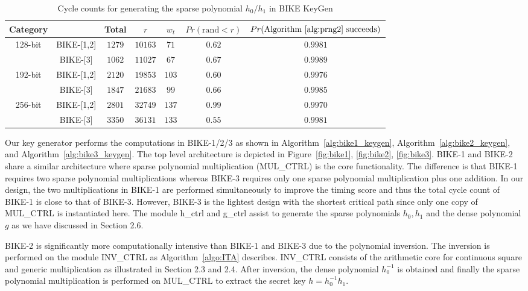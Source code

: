 \documentclass[runningheads]{llncs}
\begin{document}
\begin{table}[!tb]\centering
\caption{Cycle counts for generating the sparse polynomial $h_0/h_1$ in BIKE KeyGen}
\begin{tabular}{cc|ccccc}
  \hline
 \textbf{Category}        &             & Total & $r$  & $w_t$  & $Pr(\text{rand} < r)$& $Pr(\text{Algorithm~\ref{alg:prng2} succeeds})$\\\hline
\multirow{ 2}{*}{128-bit} &  BIKE-[1,2] & $1279$ & $10163$  & $71$  & $0.62$ & $0.9981$\\
                          &  BIKE-[3] & $1062$ & $11027$  & $67$  & $0.67$& $0.9989$\\
  \hline
\multirow{ 2}{*}{192-bit} &  BIKE-[1,2] & $2120$ & $19853$  & $103$  &$0.60$& $0.9976$\\
                          &  BIKE-[3] & $1847$ & $21683$  & $99$  &$0.66$& $0.9985$\\
  \hline
\multirow{ 2}{*}{256-bit} &  BIKE-[1,2] & $2801$ & $32749$  & $137$  &$0.99$& $0.9970$\\
                          &  BIKE-[3] & $3350$ & $36131$  & $133$  &$0.55$& $0.9981$\\
  \hline
\end{tabular}
\end{table}

Our key generator performs the computations in BIKE-1/2/3 as shown in Algorithm~\ref{alg:bike1_keygen}, Algorithm~\ref{alg:bike2_keygen}, and Algorithm~\ref{alg:bike3_keygen}. The top level architecture is depicted in Figure~\ref{fig:bike1}, \ref{fig:bike2}, \ref{fig:bike3}. BIKE-1 and BIKE-2 share a similar architecture where sparse polynomial multiplication (MUL\_CTRL) is the core functionality. The difference is that BIKE-1 requires two sparse polynomial multiplications whereas BIKE-3 requires only one sparse polynomial multiplication plus one addition. In our design, the two multiplications in BIKE-1 are performed simultaneously to improve the timing score and thus the total cycle count of BIKE-1 is close to that of BIKE-3. However, BIKE-3 is the lightest design with the shortest critical path since only one copy of MUL\_CTRL is instantiated here. The module h\_ctrl and g\_ctrl assist to generate the sparse polynomials $h_0,h_1$ and the dense polynomial $g$ as we have discussed in Section 2.6.

BIKE-2 is significantly more computationally intensive than BIKE-1 and BIKE-3 due to the polynomial inversion. The inversion is performed on the module INV\_CTRL as Algorithm~\ref{algo:ITA} describes. INV\_CTRL consists of the arithmetic core for continuous square and generic multiplication as illustrated in Section 2.3 and 2.4. After inversion, the dense polynomial $h_0^{-1}$ is obtained and finally the sparse polynomial multiplication is performed on MUL\_CTRL to extract the secret key $h=h_0^{-1}h_1$.
\end{document}
